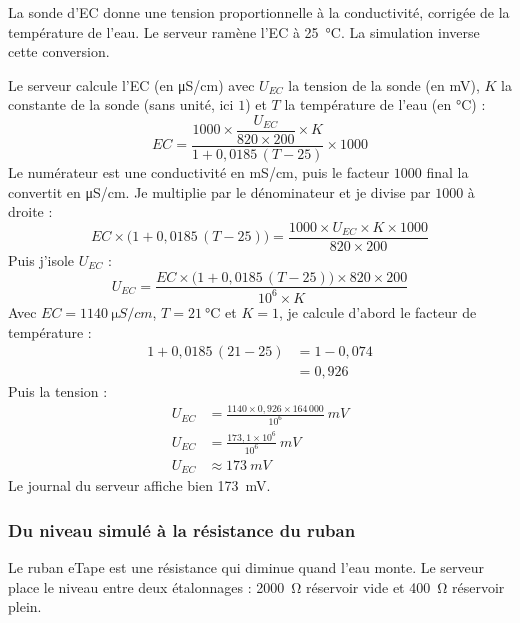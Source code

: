 La sonde d'EC donne une tension proportionnelle à la conductivité, corrigée de la température de l'eau. Le serveur ramène l'EC à \qty{25}{\celsius}. La simulation inverse cette conversion.

\begin{demonstration}
Le serveur calcule l'EC (en \unit{\micro S/cm}) avec $U_{EC}$ la tension de la sonde (en mV), $K$ la constante de la sonde (sans unité, ici $1$) et $T$ la température de l'eau (en \unit{\celsius}) :
\[
EC = \frac{1000\times\dfrac{U_{EC}}{820\times 200}\times K}{1 + 0{,}0185\,(T - 25)}\times 1000
\]
Le numérateur est une conductivité en mS/cm, puis le facteur $1000$ final la convertit en \unit{\micro S/cm}. Je multiplie par le dénominateur et je divise par $1000$ à droite :
\[
EC\times\bigl(1 + 0{,}0185\,(T - 25)\bigr) = \frac{1000\times U_{EC}\times K\times 1000}{820\times 200}
\]
Puis j'isole $U_{EC}$ :
\[
U_{EC} = \frac{EC\times\bigl(1 + 0{,}0185\,(T - 25)\bigr)\times 820\times 200}{10^{6}\times K}
\]
Avec $EC = \qty{1140}{\micro S/cm}$, $T = \qty{21}{\celsius}$ et $K = 1$, je calcule d'abord le facteur de température :
\begin{align*}
1 + 0{,}0185\,(21 - 25) &= 1 - 0{,}074\\
&= 0{,}926
\end{align*}
Puis la tension :
\begin{align*}
U_{EC} &= \frac{1140\times 0{,}926\times 164\,000}{10^{6}}\ \unit{mV}\\
U_{EC} &= \frac{173{,}1\times 10^{6}}{10^{6}}\ \unit{mV}\\
U_{EC} &\approx \qty{173}{mV}
\end{align*}
Le journal du serveur affiche bien \qty{173}{mV}.
\end{demonstration}

\subsubsection*{Du niveau simulé à la résistance du ruban}

Le ruban eTape est une résistance qui diminue quand l'eau monte. Le serveur place le niveau entre deux étalonnages : \qty{2000}{\ohm} réservoir vide et \qty{400}{\ohm} réservoir plein.

